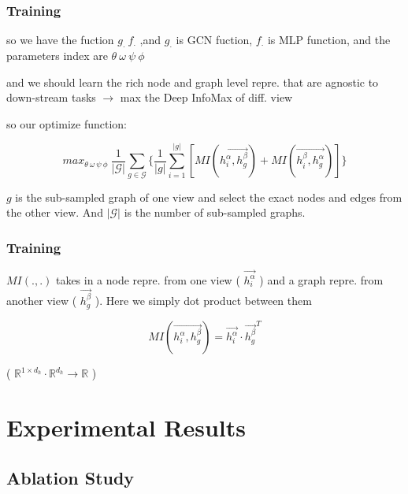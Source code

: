 \documentclass[UTF8]{beamer}
\begin{document}
    \begin{frame}
        \frametitle{Training}

        so we have the fuction $g_\cdot\ f_\cdot$ ,and $g_\cdot$ is GCN fuction, $f_\cdot$ is MLP function, and the parameters index are $\theta\ \omega\ \psi\ \phi$
        \vspace{.5cm}

        and we should learn the rich node and graph level repre. that are agnostic to down-stream tasks $\rightarrow$ max the Deep InfoMax of diff. view
        \vspace{.5cm}

        so our optimize function:

        \begin{equation*}
            max_{\theta\ \omega\ \psi\ \phi}\ \frac{1}{|\mathscr{G}|}\sum_{g\in\mathscr{G}}\{\frac{1}{|g|}\sum_{i=1}^{|g|}[MI(\vec{h_i^\alpha, h_g^\beta}) + MI(\vec{h_i^\beta, h_g^\alpha})]\}  \tag{3}
        \end{equation*}

        $g$ is the sub-sampled graph of one view and select the exact nodes and edges from the other view. And $|\mathscr{G}|$ is the number of sub-sampled graphs.
        \vspace{.5cm}

    \end{frame}

    \begin{frame}
        \frametitle{Training}

        $MI(.,.)$ takes in a node repre. from one view ( $\vec{h_i^\alpha}$ ) and a graph repre. from another view ( $\vec{h_g^\beta}$ ). Here we simply dot product between them

        \begin{equation*}
            MI(\vec{h_i^\alpha, h_g^\beta}) = \vec{h_i^\alpha}\cdot\vec{h_g^\beta}^T
        \end{equation*}

        ( $\mathbb{R}^{1\times d_h}\cdot\mathbb{R}^{d_h}\rightarrow\mathbb{R}$ )
    
    \end{frame}

    \section{Experimental Results}

    \subsection{Ablation Study}
\end{document}
